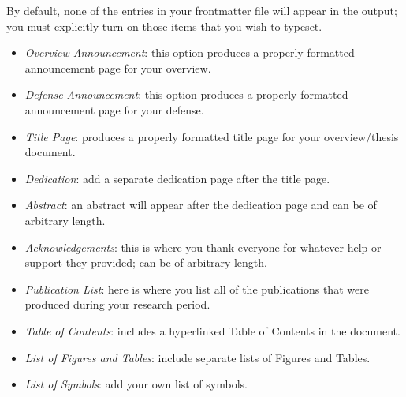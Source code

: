 \documentclass[DIV=calc, paper=letter, fontsize=11pt]{scrartcl}	 %
\begin{document}
By default, none of the entries in your frontmatter file will appear in the output; you must explicitly turn on those items that you 
wish to typeset.  
\begin{itemize}
	\item \textit{Overview Announcement}: this option produces a properly formatted announcement page for your overview.
	\item \textit{Defense Announcement}:  this option produces a properly formatted announcement page for your defense.
	\item \textit{Title Page}: produces a properly formatted title page for your overview/thesis document.
	\item \textit{Dedication}: add a separate dedication page after the title page.
	\item \textit{Abstract}: an abstract will appear after the dedication page and can be of arbitrary length.
	\item \textit{Acknowledgements}: this is where you thank everyone for whatever help or support they provided; can be of arbitrary length.
	\item \textit{Publication List}: here is where you list all of the publications that were produced during your research period.
	\item \textit{Table of Contents}: includes a hyperlinked Table of Contents in the document.
	\item \textit{List of Figures and Tables}: include separate lists of Figures and Tables.
	\item \textit{List of Symbols}: add your own list of symbols.
\end{itemize}
\end{document}
